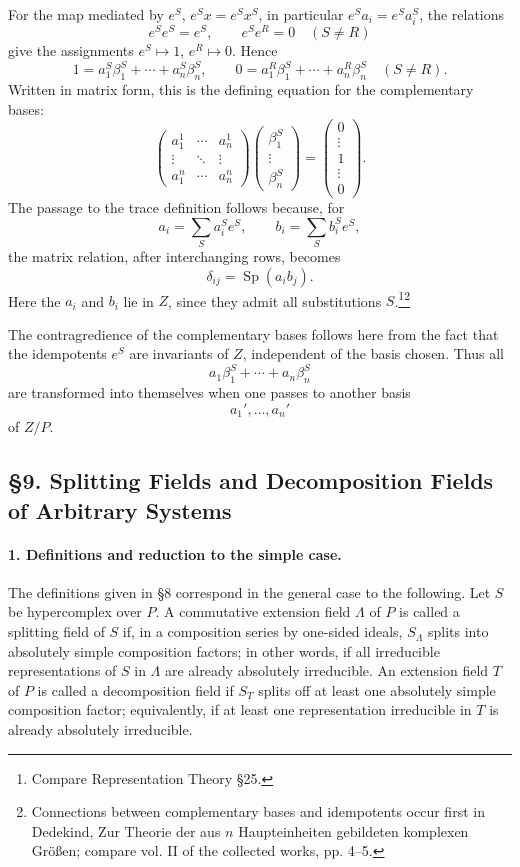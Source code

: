 \documentclass[11pt]{article}
\providecommand{\Sp}{\operatorname{Sp}}
\begin{document}
For the map mediated by \(e^S\), \(e^Sx=e^Sx^S\), in particular \(e^Sa_i=e^Sa_i^S\), the relations
\[
        e^Se^S=e^S,\qquad e^Se^R=0\quad(S\ne R)
\]
give the assignments \(e^S\mapsto1\), \(e^R\mapsto0\). Hence
\[
        1=a_1^S\beta_1^S+\cdots+a_n^S\beta_n^S,\qquad
        0=a_1^R\beta_1^S+\cdots+a_n^R\beta_n^S\quad(S\ne R).
\]
Written in matrix form, this is the defining equation for the complementary bases:
\[
\begin{pmatrix}
a_1^1 & \cdots & a_n^1\\
\vdots & \ddots & \vdots\\
a_1^n & \cdots & a_n^n
\end{pmatrix}
\begin{pmatrix}
\beta_1^S\\ \vdots\\ \beta_n^S
\end{pmatrix}
=
\begin{pmatrix}
0\\ \vdots\\ 1\\ \vdots\\ 0
\end{pmatrix}.
\]
The passage to the trace definition follows because, for
\[
        a_i=\sum_S a_i^S e^S,\qquad b_i=\sum_S b_i^S e^S,
\]
the matrix relation, after interchanging rows, becomes
\[
        \delta_{ij}=\Sp(a_i b_j).
\]
Here the \(a_i\) and \(b_i\) lie in \(Z\), since they admit all substitutions \(S\).\footnote{Compare Representation Theory §25.}\footnote{Connections between complementary bases and idempotents occur first in Dedekind, Zur Theorie der aus \(n\) Haupteinheiten gebildeten komplexen Größen; compare vol. II of the collected works, pp. 4--5.}

The contragredience of the complementary bases follows here from the fact that the idempotents \(e^S\) are invariants of \(Z\), independent of the basis chosen. Thus all
\[
        a_1\beta_1^S+\cdots+a_n\beta_n^S
\]
are transformed into themselves when one passes to another basis
\[
        a_1',\ldots,a_n'
\]
of \(Z/P\).

\subsection*{§9. Splitting Fields and Decomposition Fields of Arbitrary Systems}

\paragraph{1. Definitions and reduction to the simple case.}
The definitions given in §8 correspond in the general case to the following. Let \(S\) be hypercomplex over \(P\). A commutative extension field \(\Lambda\) of \(P\) is called a splitting field of \(S\) if, in a composition series by one-sided ideals, \(S_\Lambda\) splits into absolutely simple composition factors; in other words, if all irreducible representations of \(S\) in \(\Lambda\) are already absolutely irreducible. An extension field \(T\) of \(P\) is called a decomposition field if \(S_T\) splits off at least one absolutely simple composition factor; equivalently, if at least one representation irreducible in \(T\) is already absolutely irreducible.
\end{document}
